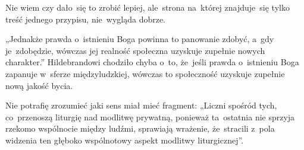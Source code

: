 \documentclass[a4paper,11pt]{article}
\begin{document}
\vspace{\spaceFour}





\noindent
{} Nie wiem czy dało~się to zrobić lepiej, ale~strona na~której
znajduje~się tylko treść jednego przypisu, nie~wygląda dobrze.

\vspace{\spaceFour}





\noindent
{} „Jednakże prawda o~istnieniu Boga powinna to panowanie zdobyć,
a~gdy je~zdobędzie, wówczas jej realność społeczna uzyskuje zupełnie nowych
charakter.” Hildebrandowi chodziło chyba o~to, że~jeśli prawda o~istnieniu
Boga zapanuje w~sferze międzyludzkiej, wówczas to społeczność uzyskuje
zupełnie nową jakość bycia.

\vspace{\spaceFour}





\noindent
{} Nie potrafię zrozumieć jaki sens miał mieć fragment: „Liczni
spośród tych, co~przenoszą liturgię nad modlitwę prywatną, ponieważ
ta~ostatnia nie sprzyja rzekomo wspólnocie między ludźmi, sprawiają
wrażenie, że~stracili z~pola widzenia ten głęboko wspólnotowy aspekt
modlitwy liturgicznej”.





\vspace{\spaceTwo}


\end{document}
